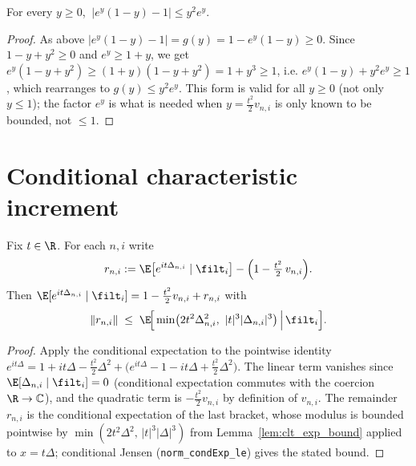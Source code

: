 \begin{lemma}\label{lem:clt_real_exp_bound_pos}
\leanok
For every $y\ge0$, $\ \big|e^{y}(1-y)-1\big|\le y^2 e^{y}$.
\end{lemma}

\begin{proof}\leanok
As above $\big|e^{y}(1-y)-1\big|=g(y)=1-e^{y}(1-y)\ge0$. Since $1-y+y^2\ge0$ and
$e^{y}\ge1+y$, we get $e^{y}(1-y+y^2)\ge(1+y)(1-y+y^2)=1+y^3\ge1$, i.e.
$e^{y}(1-y)+y^2e^{y}\ge1$, which rearranges to $g(y)\le y^2 e^{y}$. This form is
valid for all $y\ge0$ (not only $y\le1$); the factor $e^{y}$ is what is needed when
$y=\tfrac{t^2}{2}v_{n,i}$ is only known to be bounded, not $\le1$.
\end{proof}

\section{Conditional characteristic increment}
\label{sec:pre_clt_cond}

\begin{lemma}\label{lem:clt_cond_char}
\leanok
{}
Fix $t\in\R$. For each $n,i$ write
\[
  r_{n,i} := \E\big[e^{it\Delta_{n,i}}\mid\filt_i\big]
             - \Big(1 - \tfrac{t^2}{2}\,v_{n,i}\Big).
\]
Then $\E[e^{it\Delta_{n,i}}\mid\filt_i] = 1 - \tfrac{t^2}{2}v_{n,i} + r_{n,i}$
with
\[
  \|r_{n,i}\| \;\le\;
  \E\!\Big[\min\!\big(2t^2\Delta_{n,i}^2,\ |t|^3|\Delta_{n,i}|^3\big)
    \,\Big|\,\filt_i\Big].
\]
\end{lemma}

\begin{proof}\leanok
{}
Apply the conditional expectation to the pointwise identity
$e^{it\Delta} = 1 + it\Delta - \tfrac{t^2}{2}\Delta^2
 + \big(e^{it\Delta}-1-it\Delta+\tfrac{t^2}{2}\Delta^2\big)$. The linear term
vanishes since $\E[\Delta_{n,i}\mid\filt_i]=0$ (conditional expectation commutes
with the coercion $\R\to\mathbb{C}$), and the quadratic term is $-\tfrac{t^2}{2}v_{n,i}$ by
definition of $v_{n,i}$. The remainder $r_{n,i}$ is the conditional expectation of
the last bracket, whose modulus is bounded pointwise by
$\min(2t^2\Delta^2,\,|t|^3|\Delta|^3)$ from Lemma~\ref{lem:clt_exp_bound} applied to
$x=t\Delta$; conditional Jensen (\texttt{norm\_condExp\_le}) gives the stated bound.
\end{proof}

